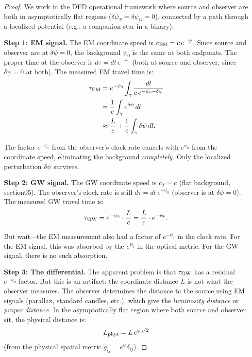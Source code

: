 \documentclass[11pt]{article}
\begin{document}
\begin{proof}
We work in the DFD operational framework where source and observer
are both in asymptotically flat regions ($\delta\psi_S = \delta\psi_O
= 0$), connected by a path through a localized potential
(e.g., a companion star in a binary).

\textbf{Step 1: EM signal.}
The EM coordinate speed is $c_{\rm EM} = c\,e^{-\psi}$. Since
source and observer are at $\delta\psi = 0$, the background
$\psi_0$ is the same at both endpoints. The proper time at the
observer is $d\tau = dt\,e^{-\psi_0}$ (both at source and observer,
since $\delta\psi = 0$ at both). The measured EM travel time is:
\begin{align}
\tau_{\rm EM} &= e^{-\psi_0}\int_\gamma \frac{dl}{c\,e^{-\psi_0 - \delta\psi}} \nonumber\\
&= \frac{1}{c}\int_\gamma e^{\delta\psi}\,dl \nonumber\\
&\approx \frac{L}{c} + \frac{1}{c}\int_\gamma \delta\psi\,dl.
\end{align}

The factor $e^{-\psi_0}$ from the observer's clock rate cancels with
$e^{\psi_0}$ from the coordinate speed, eliminating the background
\emph{completely}. Only the localized perturbation $\delta\psi$
survives.

\textbf{Step 2: GW signal.}
The GW coordinate speed is $c_T = c$ (flat background, section05).
The observer's clock rate is still $d\tau = dt\,e^{-\psi_0}$
(observer is at $\delta\psi = 0$). The measured GW travel time is:
\begin{equation}
\tau_{\rm GW} = e^{-\psi_0}\cdot\frac{L}{c} = \frac{L}{c}
\cdot e^{-\psi_0}.
\end{equation}

But wait---the EM measurement also had a factor of $e^{-\psi_0}$
in the clock rate. For the EM signal, this was absorbed by the
$e^{\psi_0}$ in the optical metric. For the GW signal, there is
no such absorption.

\textbf{Step 3: The differential.}
The apparent problem is that $\tau_{\rm GW}$ has a residual $e^{-\psi_0}$
factor. But this is an artifact: the coordinate distance $L$ is not what
the observer measures. The observer determines the distance to the
source using EM signals (parallax, standard candles, etc.), which
give the \emph{luminosity distance} or \emph{proper distance}. In
the asymptotically flat region where both source and observer sit,
the physical distance is:
\begin{equation}
L_{\rm phys} = L\,e^{\psi_0/2}
\end{equation}
(from the physical spatial metric $\tilde{g}_{ij} = e^{\psi}\delta_{ij}$).


\end{proof}
\end{document}
